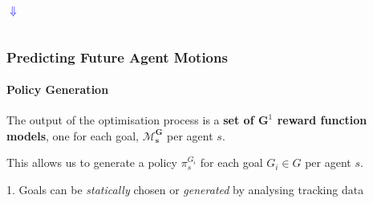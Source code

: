 \begin{frame}
\begin{columns}[T]
		\centering
		
	\end{columns}
	
	\begin{columns}[T]
		\column{\textwidth}
		
		\centering
		\vspace{-3.1cm}
		\hspace{-1cm}
		\Huge
		\begin{rotate}{-45}
			
			\textcolor{blue}{\textbf{$ \Downarrow $}}
		\end{rotate}	
	\end{columns}
\end{frame}

\begin{frame}
	\frametitle{Predicting Future Agent Motions}
	\framesubtitle{Policy Generation}
	
	\LARGE
	
	\vspace{1cm}
	
	The output of the optimisation process is a \textbf{set of $ \mathbf{G}^1 $ reward function models},
	one for each goal, $ \mathbf{\mathcal{M}_s^G} $ per agent $ s $. \\
	
	\vspace{0.4cm}
	
	This allows us to generate a policy $ \pi_s^{G_i} $ for each goal $ G_i \in G $ per agent $ s $. \\
	
	\vspace{1.3cm}
	
	\normalsize
	
	1. Goals can be \emph{statically} chosen or \emph{generated} by analysing tracking data
\end{frame}

